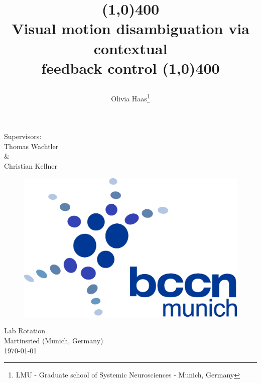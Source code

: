 \documentclass[a4paper]{article}
\begin{document}
\begin{titlepage}
\thispagestyle{empty}
\addtolength{\voffset}{-1cm}
\title{ 
\linethickness{0.7mm}
\begin{center}
\line(1,0){400}\vspace{0.5cm}\\
\textbf{Visual motion disambiguation via contextual \\
		feedback control}
\line(1,0){400}\vspace{1cm}
\end{center}}
\author{Olivia Haas\thanks{LMU - Graduate school of Systemic Neurosciences - Munich, Germany}}
\date{}


\maketitle
\begin{center}
Supervisors:\\
\vspace{1mm}
Thomas Wachtler\\
\&\\
Christian Kellner\\

\vspace{0.5cm}
\begin{figure}[ht]
\centering
\includegraphics[scale=0.20]{BCCN}
\end{figure}
\vspace{0.5cm}

Lab Rotation\\
Martinsried (Munich, Germany)\\
\today\\


\end{center}
\end{titlepage}
\end{document}
